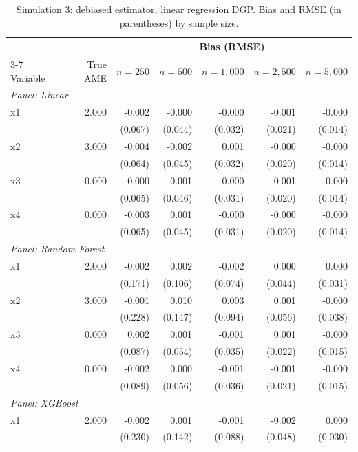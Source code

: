 \begin{table}[htbp]
\centering
\small
\begin{threeparttable}
\caption{Simulation 3: debiased estimator, linear regression DGP. Bias and RMSE (in parentheses) by sample size.}
\label{tab:sim3_bias_regression_linear}
\begin{tabular}{lrrrrrr}
\toprule
 & & \multicolumn{5}{c}{Bias (RMSE)} \\
\cmidrule(lr){3-7}
Variable & True AME & $n=250$ & $n=500$ & $n=1,000$ & $n=2,500$ & $n=5,000$ \\
\midrule
\multicolumn{7}{l}{\textit{Panel: Linear}} \\
\quad x1 & 2.000 & -0.002 & -0.000 & -0.000 & -0.001 & -0.000 \\
 &  & (0.067) & (0.044) & (0.032) & (0.021) & (0.014) \\
\quad x2 & 3.000 & -0.004 & -0.002 & 0.001 & -0.000 & -0.000 \\
 &  & (0.064) & (0.045) & (0.032) & (0.020) & (0.014) \\
\quad x3 & 0.000 & -0.000 & -0.001 & -0.000 & 0.001 & -0.000 \\
 &  & (0.065) & (0.046) & (0.031) & (0.020) & (0.014) \\
\quad x4 & 0.000 & -0.003 & 0.001 & -0.000 & -0.000 & -0.000 \\
 &  & (0.065) & (0.045) & (0.031) & (0.020) & (0.014) \\
\midrule
\multicolumn{7}{l}{\textit{Panel: Random Forest}} \\
\quad x1 & 2.000 & -0.002 & 0.002 & -0.002 & 0.000 & 0.000 \\
 &  & (0.171) & (0.106) & (0.074) & (0.044) & (0.031) \\
\quad x2 & 3.000 & -0.001 & 0.010 & 0.003 & 0.001 & -0.000 \\
 &  & (0.228) & (0.147) & (0.094) & (0.056) & (0.038) \\
\quad x3 & 0.000 & 0.002 & 0.001 & -0.001 & 0.001 & -0.000 \\
 &  & (0.087) & (0.054) & (0.035) & (0.022) & (0.015) \\
\quad x4 & 0.000 & -0.002 & 0.000 & -0.001 & -0.001 & -0.000 \\
 &  & (0.089) & (0.056) & (0.036) & (0.021) & (0.015) \\
\midrule
\multicolumn{7}{l}{\textit{Panel: XGBoost}} \\
\quad x1 & 2.000 & -0.002 & 0.001 & -0.001 & -0.002 & 0.000 \\
 &  & (0.230) & (0.142) & (0.088) & (0.048) & (0.030) \\

\end{tabular}
\end{threeparttable}
\end{table}
